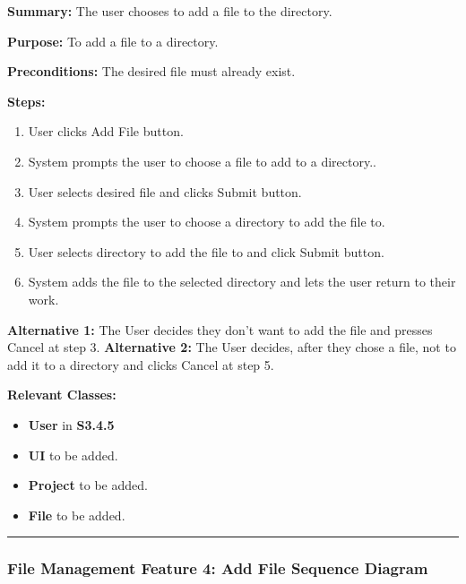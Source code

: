 \documentclass[twoside,letterpaper]{article}
\begin{document}
\noindent\textbf{Summary:} The user chooses to add a file to the directory. \newline

\noindent\textbf{Purpose:} To add a file to a directory. \newline

\noindent\textbf{Preconditions:} The desired file must already exist. \newline

\noindent\textbf{Steps:} \begin{enumerate}
	\item User clicks Add File button.
	\item System prompts the user to choose a file to add to a directory..
	\item User selects desired file and clicks Submit button.
	\item System prompts the user to choose a directory to add the file to.
	\item User selects directory to add the file to and click Submit button.
	\item System adds the file to the selected directory and lets the user return to their work.

\end{enumerate}
\noindent\textbf{Alternative 1:} The User decides they don't want to add the file and presses Cancel at step 3. \newline
\noindent\textbf{Alternative 2:} The User decides, after they chose a file, not to add it to a directory and clicks Cancel at step 5. \newline

\noindent\textbf{Relevant Classes:}
\begin{itemize}
	\item \textbf{User} in \textbf{S3.4.5}
	\item \textbf{UI} to be added.
	\item \textbf{Project} to be added.
	\item \textbf{File} to be added.
\end{itemize}
\vspace{8pt}
\hrule
\bigskip

\newpage

\subsubsection[File Management Feature 4: Add File Sequence Diagram]{\rmfamily\bfseries\color{black}
	File Management Feature 4: Add File Sequence Diagram}
\hypertarget{RefHeading22059017292}{}
\end{document}
